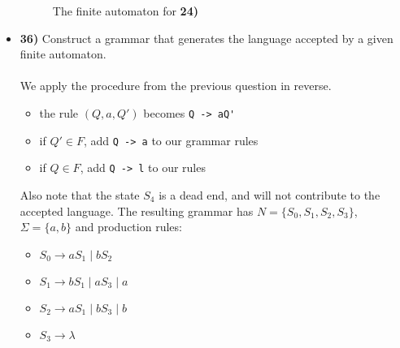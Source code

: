 \documentclass[defaultpackages]{simplereport}
\begin{document}
\begin{itemize}[label=]
\begin{figure}[H]
     \caption{The finite automaton for \textbf{24)}}
     \end{figure}
   \item \textbf{36)} Construct a grammar that generates the language accepted
     by a given finite automaton.\\\\
     We apply the procedure from the previous question in reverse.
     \begin{itemize}[label=$\cdot$]
      \item the rule $(Q, a, Q')$ becomes \lstinline{Q -> aQ'}
      \item if $Q' \in F$, add \lstinline{Q -> a} to our grammar rules
      \item if $Q \in F$, add \lstinline{Q -> l} to our rules
      \end{itemize}
      Also note that the state $S_4$ is a dead end, and will not contribute to
      the accepted language. The resulting grammar has $N = \{S_0, S_1, S_2,
      S_3\}$, $\Sigma = \{a, b\}$ and production rules:
      \begin{itemize}[label=]
      \item $S_0 \rightarrow aS_1 \mid bS_2$
        \item $S_1 \rightarrow bS_1 \mid aS_3 \mid a$
        \item $S_2 \rightarrow aS_1 \mid bS_3 \mid b$
          \item $S_3 \rightarrow \lambda$
        \end{itemize}
  \end{itemize}
\end{document}
